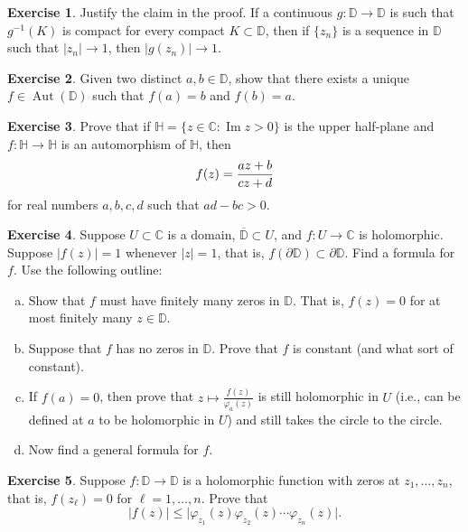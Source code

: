 \documentclass[12pt,openany]{book}
\newcommand{\avoidbreak}{\postdisplaypenalty=100}
\renewcommand{\Im}{\operatorname{Im}}
\newcommand{\Aut}{\operatorname{Aut}}
\newcommand{\sabs}[1]{\lvert {#1} \rvert}
\newcommand{\C}{{\mathbb{C}}}
\newcommand{\D}{{\mathbb{D}}}
\newcommand{\bH}{{\mathbb{H}}}
\theoremstyle{plain}
\theoremstyle{remark}
\theoremstyle{definition}
\newenvironment{exbox}{%
    \def\FrameCommand{\vrule width 1pt \relax\hspace{10pt}}%
    \MakeFramed{\advance\hsize-\width\FrameRestore}%
}{%
    \endMakeFramed
}
\newenvironment{exparts}{%
    \leavevmode\begin{enumerate}[a),noitemsep,topsep=0pt,parsep=0pt,partopsep=0pt]
}{%
    \end{enumerate}
}
\theoremstyle{exercise}
\newtheorem{exercise}{Exercise}[section]
\theoremstyle{example}
\begin{document}
\begin{exbox}
\begin{exercise}
Justify the claim in the proof.  If a continuous
$g \colon \D \to \D$ is such that $g^{-1}(K)$ is compact
for every compact $K \subset \D$, then if $\{ z_n \}$ is a sequence
in $\D$ such that $\sabs{z_n} \to 1$, then
$\sabs{g(z_n)} \to 1$.
\end{exercise}

\begin{exercise}
Given two distinct $a,b \in \D$, show that there exists a unique 
$f \in \Aut(\D)$
such that $f(a) = b$ and $f(b) = a$.
\end{exercise}

\begin{exercise}
Prove that if $\bH = \{ z \in \C : \Im z > 0 \}$ is the upper half-plane
and $f \colon \bH \to \bH$ is an automorphism of $\bH$, then
\begin{equation*}
f(z) = \frac{a z +b}{c z + d}
\avoidbreak
\end{equation*}
for real numbers $a,b,c,d$ such that $ad-bc > 0$.
\end{exercise}

\begin{exercise}
Suppose $U \subset \C$ is a domain, $\overline{\D} \subset U$,
and $f \colon U \to \C$ is holomorphic.
Suppose $\sabs{f(z)}=1$ whenever $\sabs{z}=1$,
that is, $f(\partial \D) \subset \partial \D$.
Find a formula for $f$.  Use the following outline:
\begin{exparts}
\item
Show that $f$ must have finitely many zeros in $\D$.  That is, $f(z) = 0$
for at most finitely many $z \in \D$.
\item
Suppose that $f$ has no zeros in $\D$.  Prove that $f$ is constant
(and what sort of constant).
\item
If $f(a) = 0$, then prove that
$z \mapsto \frac{f(z)}{\varphi_a(z)}$ is still holomorphic in $U$
(i.e., can be defined at $a$ to be holomorphic in $U$)
and still takes the circle to the circle.
\item
Now find a general formula for $f$.
\end{exparts}
\end{exercise}

\begin{exercise}
Suppose $f \colon \D \to \D$ is a holomorphic function with zeros at
$z_1,\ldots,z_n$, that is, $f(z_\ell) = 0$ for $\ell=1,\ldots,n$.  Prove that
\begin{equation*}
\sabs{f(z)} \leq \sabs{\varphi_{z_1}(z)  
\varphi_{z_2}(z)
\cdots
\varphi_{z_n}(z)} .
\end{equation*}
\end{exercise}


\end{exbox}
\end{document}
